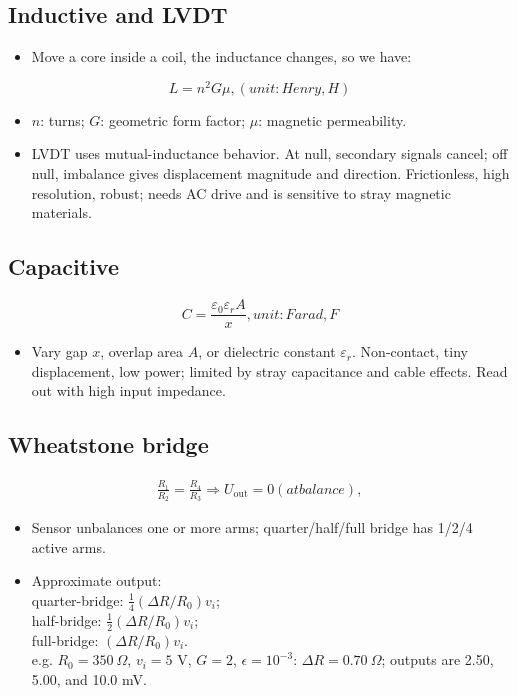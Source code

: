 \documentclass[10pt,a4paper]{ctexart}
\newcommand{\formula}[1]{%
  \par\vspace{1pt}%
  \begingroup
  \setlength{\abovedisplayskip}{0pt}%
  \setlength{\belowdisplayskip}{0pt}%
  \[
    #1
  \]
  \endgroup
  \vspace{1pt}%
}
\begin{document}
\begin{multicols*}{3}
\subsection{Inductive and LVDT}
\begin{itemize}
    \item Move a core inside a coil, the inductance changes, so we have:
\end{itemize}

\formula{\displaystyle L=n^2G\mu, (unit: Henry, H)}

\begin{itemize}
  \item $n$: turns; $G$: geometric form factor; $\mu$: magnetic permeability.
  \item LVDT uses mutual-inductance behavior. At null, secondary signals cancel;
  off null, imbalance gives displacement magnitude and direction.
  Frictionless, high resolution, robust; needs AC drive and is sensitive to stray
  magnetic materials.
\end{itemize}

\subsection{Capacitive}
\formula{\displaystyle C=\frac{\varepsilon_0\varepsilon_r A}{x}, unit: Farad, F}
\begin{itemize}
  \item Vary gap $x$, overlap area $A$, or dielectric constant $\varepsilon_r$.
  Non-contact, tiny displacement, low power; limited by stray capacitance and
  cable effects. Read out with high input impedance.
\end{itemize}

\subsection{Wheatstone bridge}
\formula{\displaystyle
  \begin{aligned}
    \frac{R_1}{R_2}=\frac{R_4}{R_3}\Rightarrow U_\mathrm{out}=0(at balance),
  \end{aligned}}

\begin{itemize}
  \item Sensor unbalances one or more arms; quarter/half/full bridge has 1/2/4 active arms.
  \item Approximate output: \\
  quarter-bridge: $\frac14(\Delta R/R_0)v_i$;\\
  half-bridge: $\frac12(\Delta R/R_0)v_i$; \\
  full-bridge: $(\Delta R/R_0)v_i$.\\
  e.g. $R_0=350~\Omega$, $v_i=5$ V, $G=2$, $\epsilon=10^{-3}$:
  $\Delta R=0.70~\Omega$; outputs are 2.50, 5.00, and 10.0 mV.
\end{itemize}


\end{multicols*}
\end{document}
